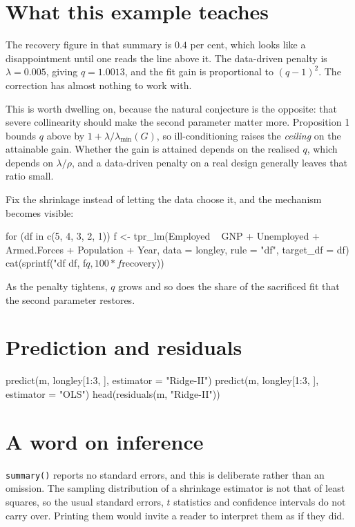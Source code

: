 \documentclass[11pt,a4paper]{report}
\begin{document}
\section{What this example teaches}

The recovery figure in that summary is $0.4$ per cent, which looks like
a disappointment until one reads the line above it. The data-driven
penalty is $\lambda = 0.005$, giving $q = 1.0013$, and the fit gain is
proportional to $(q-1)^2$. The correction has almost nothing to work
with.

This is worth dwelling on, because the natural conjecture is the
opposite: that severe collinearity should make the second parameter
matter more. Proposition 1 bounds $q$ above by
$1 + \lambda/\lambda_{\min}(G)$, so ill-conditioning raises the
\emph{ceiling} on the attainable gain. Whether the gain is attained
depends on the realised $q$, which depends on $\lambda/\rho$, and a
data-driven penalty on a real design generally leaves that ratio small.

Fix the shrinkage instead of letting the data choose it, and the
mechanism becomes visible:

\begin{Rblock}
for (df in c(5, 4, 3, 2, 1)) {
  f <- tpr_lm(Employed ~ GNP + Unemployed + Armed.Forces +
                Population + Year, data = longley,
              rule = "df", target_df = df)
  cat(sprintf("df %
              df, f$q, 100 * f$recovery))
}
\end{Rblock}

As the penalty tightens, $q$ grows and so does the share of the
sacrificed fit that the second parameter restores.

\section{Prediction and residuals}

\begin{Rblock}
predict(m, longley[1:3, ], estimator = "Ridge-II")
predict(m, longley[1:3, ], estimator = "OLS")
head(residuals(m, "Ridge-II"))
\end{Rblock}

\section{A word on inference}

\texttt{summary()} reports no standard errors, and this is deliberate
rather than an omission. The sampling distribution of a shrinkage
estimator is not that of least squares, so the usual standard errors,
$t$ statistics and confidence intervals do not carry over. Printing them
would invite a reader to interpret them as if they did.
\end{document}
